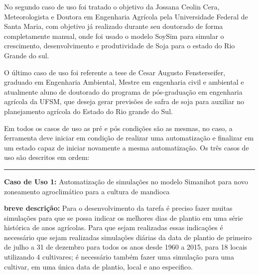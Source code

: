 \documentclass[tg]{mdtufsm}
\begin{document}
            	No segundo caso de uso foi tratado o objetivo da Jossana Ceolin Cera, Meteorologista e Doutora em Engenharia Agrícola pela Universidade Federal de Santa Maria, com objetivo já realizado durante seu doutorado de forma completamente manual, onde foi usado o modelo SoySim para simular o crescimento, desenvolvimento e produtividade de Soja para o estado do Rio Grande do sul.

                O último caso de uso foi referente a tese de Cesar Augusto Fensterseifer, graduado em Engenharia Ambiental, Mestre em engenharia civil e ambiental e atualmente aluno de doutorado do programa de pós-graduação em engenharia agrícola da UFSM, que deseja gerar previsões de safra de soja para auxiliar no planejamento agrícola do Estado do Rio grande do Sul.

            	Em todos os casos de uso as pré e pós condições são as mesmas, no caso, a ferramenta deve iniciar em condição de realizar uma automatização e finalizar em um estado capaz de iniciar novamente a mesma automatização. Os três casos de uso são descritos em ordem:
            	\bigskip \bigskip \bigskip \bigskip


            	\hrule \bigskip
            	{\bf Caso de Uso 1:}
                    Automatização de simulações no modelo Simanihot para novo zoneamento agroclimático para a cultura de mandioca
            	    \bigskip

            	{\bf breve descrição:}
                    Para o desenvolvimento da tarefa é preciso fazer muitas simulações para que se possa indicar os melhores dias de plantio em uma série histórica de anos agrícolas. Para que sejam realizadas essas indicações é necessário que sejam realizadas simulações diárias da data de plantio de primeiro de julho a 31 de dezembro para todos os anos desde 1960 a 2015, para 18 locais utilizando 4 cultivares; é necessário também fazer uma simulação para uma cultivar, em uma única data de plantio, local e ano especifico.
                    \bigskip
\end{document}
